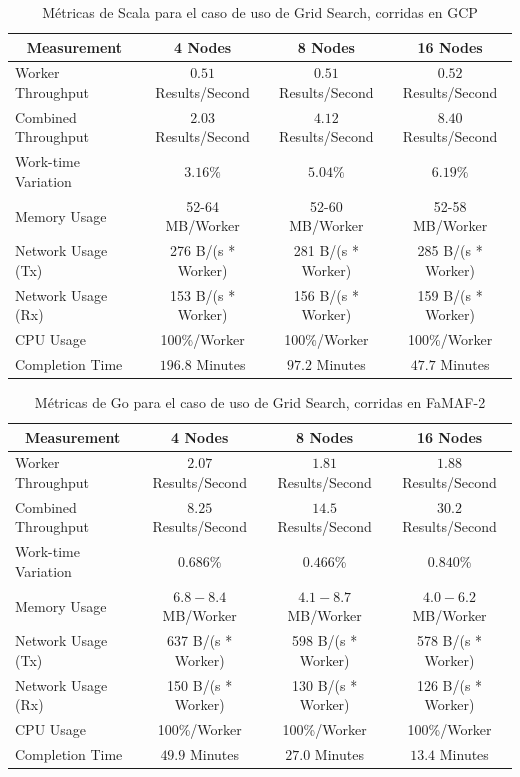 \documentclass[11pt]{article}
\newcommand{\gscap}[2]{\caption{Métricas de #1 para el caso de uso de Grid Search, corridas en #2}}
\begin{document}
\begin{table}[H]
\centering
\begin{tabular}{|l|c|c|c|}
\hline
\multicolumn{1}{|c|}{Measurement} & 4 Nodes & 8 Nodes & 16 Nodes \\ \hline
Worker Throughput & $0.51$ Results/Second & $0.51$ Results/Second & $0.52$ Results/Second \\ \hline
Combined Throughput & $2.03$ Results/Second & $4.12$ Results/Second & $8.40$ Results/Second \\ \hline
Work-time Variation & $3.16\%$& $5.04\%$& $6.19\%$\\ \hline
Memory Usage & 52-64 MB/Worker & 52-60 MB/Worker & 52-58 MB/Worker \\ \hline
Network Usage (Tx) & 276 B/(s * Worker) & 281 B/(s * Worker) & 285 B/(s * Worker) \\ \hline
Network Usage (Rx) & 153 B/(s * Worker) & 156 B/(s * Worker) & 159 B/(s * Worker) \\ \hline
CPU Usage & 100\%/Worker & 100\%/Worker & 100\%/Worker \\ \hline
Completion Time & $196.8$ Minutes & $97.2$ Minutes & $47.7$ Minutes \\ \hline
\end{tabular}
\gscap{Scala}{GCP}
\end{table}

\begin{table}[H]
\centering
\begin{tabular}{|l|c|c|c|}
\hline
\multicolumn{1}{|c|}{Measurement} & 4 Nodes & 8 Nodes & 16 Nodes \\ \hline
Worker Throughput & $2.07$ Results/Second & $1.81$ Results/Second & $1.88$ Results/Second \\ \hline
Combined Throughput & $8.25$ Results/Second & $14.5$ Results/Second & $30.2$ Results/Second \\ \hline
Work-time Variation & $0.686$\% & $0.466$\% & $0.840$\% \\ \hline
Memory Usage & $6.8-8.4$ MB/Worker & $4.1-8.7$ MB/Worker & $4.0-6.2$ MB/Worker \\ \hline
Network Usage (Tx) & 637 B/(s * Worker) & 598 B/(s * Worker) & 578 B/(s * Worker) \\ \hline
Network Usage (Rx) & 150 B/(s * Worker) & 130 B/(s * Worker) & 126 B/(s * Worker) \\ \hline
CPU Usage & 100\%/Worker & 100\%/Worker & 100\%/Worker \\ \hline
Completion Time & $49.9$ Minutes & $27.0$ Minutes & $13.4$ Minutes \\ \hline
\end{tabular}
\gscap{Go}{FaMAF-2}
\end{table}
\end{document}
